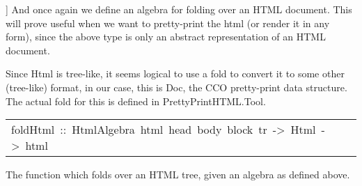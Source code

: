\begin{haddockdesc}
\begin{tabular}{@{}l}
\end{tabular}]\haddockbegindoc
And once again we define an algebra for folding over an HTML document.
 This will prove useful when we want to pretty-print the html (or render
 it in any form), since the above type is only an abstract representation of 
 an HTML document.
\par
Since Html is tree-like, it seems logical to use a fold to convert it to some other
 (tree-like) format, in our case, this is Doc, the CCO pretty-print data structure. The actual
 fold for this is defined in PrettyPrintHTML.Tool. 
\par

\end{haddockdesc}
\begin{haddockdesc}
\item[\begin{tabular}{@{}l}
foldHtml\ ::\ HtmlAlgebra\ html\ head\ body\ block\ tr\ ->\ Html\ ->\ html
\end{tabular}]\haddockbegindoc
The function which folds over an HTML tree, given an algebra as defined above.
\par

\end{haddockdesc}